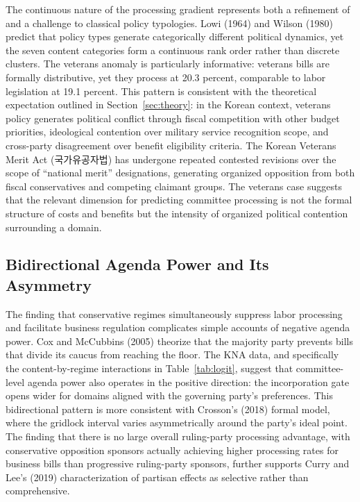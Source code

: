 \documentclass[11pt]{article}
\begin{document}
The continuous nature of the processing gradient represents both a refinement of and a challenge to classical policy typologies. Lowi (1964) and Wilson (1980) predict that policy types generate categorically different political dynamics, yet the seven content categories form a continuous rank order rather than discrete clusters. The veterans anomaly is particularly informative: veterans bills are formally distributive, yet they process at 20.3 percent, comparable to labor legislation at 19.1 percent. This pattern is consistent with the theoretical expectation outlined in Section~\ref{sec:theory}: in the Korean context, veterans policy generates political conflict through fiscal competition with other budget priorities, ideological contention over military service recognition scope, and cross-party disagreement over benefit eligibility criteria. The Korean Veterans Merit Act (국가유공자법) has undergone repeated contested revisions over the scope of ``national merit'' designations, generating organized opposition from both fiscal conservatives and competing claimant groups. The veterans case suggests that the relevant dimension for predicting committee processing is not the formal structure of costs and benefits but the intensity of organized political contention surrounding a domain.

\subsection*{Bidirectional Agenda Power and Its Asymmetry}

The finding that conservative regimes simultaneously suppress labor processing and facilitate business regulation complicates simple accounts of negative agenda power. Cox and McCubbins (2005) theorize that the majority party prevents bills that divide its caucus from reaching the floor. The KNA data, and specifically the content-by-regime interactions in Table~\ref{tab:logit}, suggest that committee-level agenda power also operates in the positive direction: the incorporation gate opens wider for domains aligned with the governing party's preferences. This bidirectional pattern is more consistent with Crosson's (2018) formal model, where the gridlock interval varies asymmetrically around the party's ideal point. The finding that there is no large overall ruling-party processing advantage, with conservative opposition sponsors actually achieving higher processing rates for business bills than progressive ruling-party sponsors, further supports Curry and Lee's (2019) characterization of partisan effects as selective rather than comprehensive.
\end{document}
